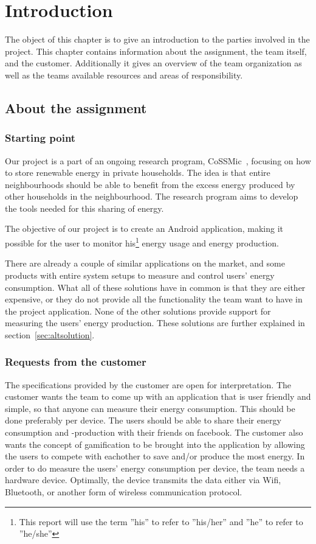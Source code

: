 \chapter{Introduction}
The object of this chapter is to give an introduction to the parties involved in the project. This chapter contains information about the assignment, the team itself, and the customer.
Additionally it gives an overview of the team organization as well as the teams available resources and areas of responsibility.

\newpage
\section{About the assignment}
\subsection{Starting point}
Our project is a part of an ongoing research program, CoSSMic~\cite{cossmic}, focusing on how to store renewable energy in private households. 
The idea is that entire neighbourhoods should be able to benefit from the excess energy produced by other households in the neighbourhood. 
The research program aims to develop the tools needed for this sharing of energy. 

The objective of our project is to create an Android application, making it possible for the user to monitor his\footnote{This report will use the term ''his'' to refer to ''his/her'' and ''he'' to refer to ''he/she''} 
energy usage and energy production. 

There are already a couple of similar applications on the market, and some products with entire system setups to measure and control users' energy consumption. 
What all of these solutions have in common is that they are either expensive, or they do not provide all the functionality the team want to have in the project application. 
None of the other solutions provide support for measuring the users' energy production. These solutions are further explained in section~\ref{sec:altsolution}.

\subsection{Requests from the customer}
The specifications provided by the customer are open for interpretation. The customer wants the team to come up with an application that is user friendly and simple, 
so that anyone can measure their energy consumption. This should be done preferably per device. The users should be able to share their energy consumption and -production with their friends on \gls{facebook}. 
The customer also wants the concept of \gls{gamification} to be brought into the application by allowing the users to compete with eachother to save and/or produce the most energy. 
In order to do measure the users' energy consumption per device, the team needs a hardware device. Optimally, the device transmits the data either via Wifi, Bluetooth, or another form of wireless communication protocol. 

